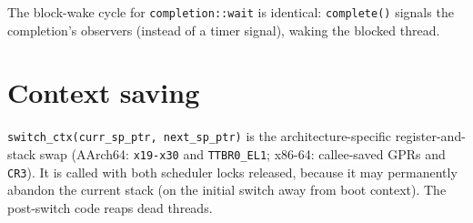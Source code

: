 The block-wake cycle for \texttt{completion::wait} is identical:
\texttt{complete()} signals the completion's observers (instead of a timer
signal), waking the blocked thread.

\section{Context saving}

\texttt{switch\_ctx(curr\_sp\_ptr, next\_sp\_ptr)} is the architecture-specific
register-and-stack swap (AArch64: \texttt{x19-x30} and \texttt{TTBR0\_EL1};
x86-64: callee-saved GPRs and \texttt{CR3}). It is called with both scheduler
locks released, because it may permanently abandon the current stack (on the
initial switch away from boot context). The post-switch code reaps dead
threads.

\endinput
